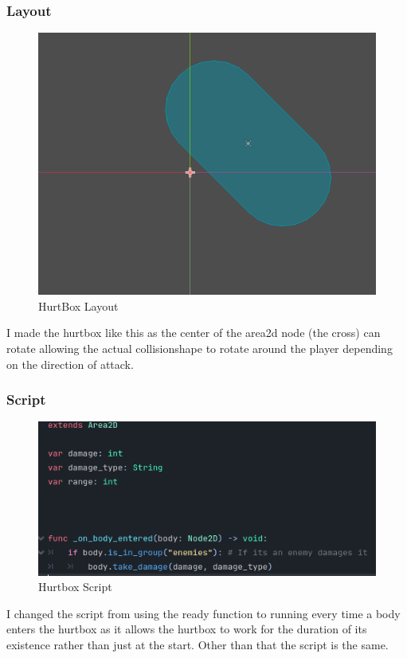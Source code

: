 \documentclass{article}
\begin{document}
        \subsubsection{Layout}
        \begin{figure}[H]
                \centering
                \includegraphics{images/development/HurtBox.PNG}
                \caption{HurtBox Layout}
        \end{figure}
        I made the hurtbox like this as the center of the area2d node (the cross) can rotate allowing the actual collisionshape to rotate around the player depending on the direction of attack.\\
        \subsubsection{Script}
        \begin{figure}[H]
                \centering
                \includegraphics{images/development/HurtBox_Script.PNG}
                \caption{Hurtbox Script}
        \end{figure}
        I changed the script from using the ready function to running every time a body enters the hurtbox as it allows the hurtbox to work for the duration of its existence rather than just at the start. Other than that the script is the same.\\
\end{document}
